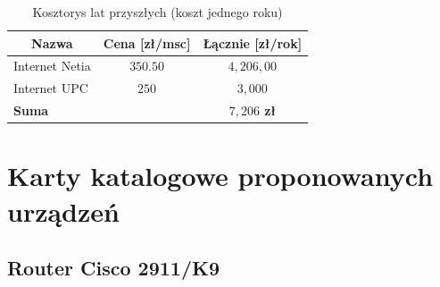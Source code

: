 \documentclass[a4paper,12pt]{extarticle}  %
\begin{document}
\begin{table}[H]
	\centering
	\caption{Kosztorys lat przyszłych (koszt jednego roku)}
	\begin{tabular}{|lc|c|}
		\hline
		\multicolumn{1}{|c|}{\textbf{Nazwa}} & \textbf{Cena [zł/msc]} & \textbf{Łącznie [zł/rok]} \\ \hline
		\multicolumn{1}{|l|}{Internet Netia} & $350.50$               & $4,206,00$                \\ \hline
		\multicolumn{1}{|l|}{Internet UPC}   & $250$                  & $3,000$                   \\ \hline
		\textbf{Suma}                        & \multicolumn{1}{l|}{}  & \textbf{$7,206$ zł}       \\ \hline
	\end{tabular}
\end{table}

\section{Karty katalogowe proponowanych urządzeń}
\subsection{Router Cisco 2911/K9}
\begin{figure}[H]
	\centering
\end{figure}
\end{document}
